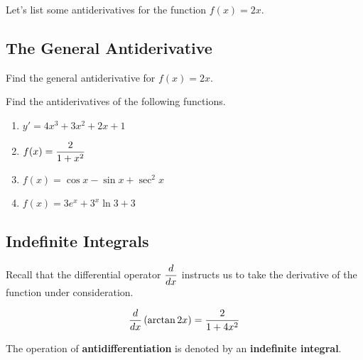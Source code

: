 \documentclass[12pt]{article}
\begin{document}
\Example Let's list some antiderivatives for the function $f(x)=2x$. 

\newpage

\subsection*{The General Antiderivative}


\vspace{5mm}

\Example Find the general antiderivative for $f(x)=2x$. 

\vspace{20mm}

\Example Find the antiderivatives of the following functions.
\begin{enumerate}
\item[\tc{1}] $y'=4x^3+3x^2+2x+1$

\vspace{20mm}

\item[\tc{2}] $f(x)=\displaystyle\frac{2}{1+x^2}$

\vspace{20mm}

\item[\tc{3}] $f(x)=\cos x-\sin x+\sec^2 x$

\vspace{20mm}

\item[\tc{4}] $f(x)=3e^x+3^x\ln 3 + 3$

\vspace{20mm}
\end{enumerate}

\subsection*{Indefinite Integrals}

Recall that the differential operator $\displaystyle\frac{d}{dx}$ instructs us to take the derivative of the function under consideration.


$$\frac{d}{dx}\left( \arctan 2x\right) =\frac{2}{1+4x^2}$$

\newpage

The operation of \textbf{antidifferentiation} is denoted by an \textbf{indefinite integral}.
\end{document}
